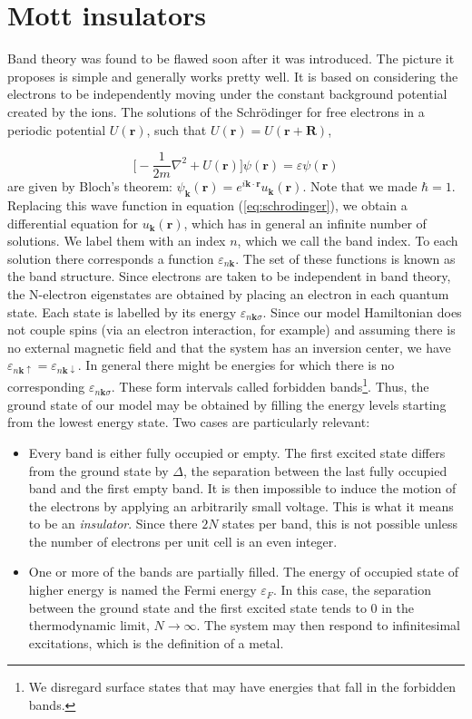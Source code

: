 \section{Mott insulators}

Band theory was found to be flawed soon after it was introduced. The picture it proposes is simple and generally works pretty well. It is based on considering the electrons to be independently moving under the constant background potential created by the ions. The solutions of the Schr\"odinger for free electrons in a periodic potential $U(\bm r)$, such that $U(\bm r) = U(\bm r + \bm R)$,

\begin{equation}\label{eq:schrodinger}
\bigg[ -\frac{1}{2m} \nabla^2 + U(\bm r) \bigg] \psi (\bm r) = \varepsilon \psi (\bm r)
\end{equation}
are given by Bloch's theorem: $\psi_{\bm k} (\bm r) = e^{i\bm k \cdot \bm r} u_{\bm k} (\bm r)$. Note that we made $\hbar = 1$. Replacing this wave function in equation (\ref{eq:schrodinger}), we obtain a differential equation for $u_{\bm k} (\bm r)$, which has in general an infinite number of solutions. We label them with an index $n$, which we call the band index. To each solution there corresponds a function $\varepsilon_{n\bm k}$. The set of these functions is known as the band structure. Since electrons are taken to be independent in band theory, the N-electron eigenstates are obtained by placing an electron in each quantum state. Each state is labelled by its energy $\varepsilon_{n\bm k \sigma}$. Since our model Hamiltonian does not couple spins (via an electron interaction, for example) and assuming there is no external magnetic field and that the system has an inversion center, we have $\varepsilon_{n\bm k \uparrow} = \varepsilon_{n\bm k \downarrow}$. In general there might be energies for which there is no corresponding $\varepsilon_{n\bm k \sigma}$. These form intervals called forbidden bands\footnote{We disregard surface states that may have energies that fall in the forbidden bands.}. Thus, the ground state of our model may be obtained by filling the energy levels starting from the lowest energy state. Two cases are particularly relevant:
\begin{itemize}
\item Every band is either fully occupied or empty. The first excited state differs from the ground state by $\Delta$, the separation between the last fully occupied band and the first empty band. It is then impossible to induce the motion of the electrons by applying an arbitrarily small voltage. This is what it means to be an \emph{insulator}. Since there $2N$ states per band, this is not possible unless the number of electrons per unit cell is an even integer.
\item One or more of the bands are partially filled. The energy of occupied state of higher energy is named the Fermi energy $\varepsilon_F$. In this case, the separation between the ground state and the first excited state tends to $0$ in the thermodynamic limit, $N \rightarrow \infty$. The system may then respond to infinitesimal excitations, which is the  definition of a metal.
\end{itemize}

